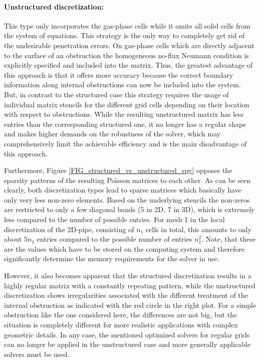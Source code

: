 \paragraph{Unstructured discretization:} This type only incorporates the gas-phase cells while it omits all solid cells from the system of equations. This strategy is the only way to completely get rid of the undesirable penetration errors. On gas-phase cells which are directly adjacent to the surface of an obstruction the homogeneous no-flux Neumann condition is explicitly specified and included into the matrix. Thus, the greatest advantage of this approach is that it offers more accuracy because the correct boundary information along  internal obstructions can now be included into the system. But, in contrast to the structured case this strategy requires the usage of individual matrix stencils for the different grid cells depending on their location with respect to obstructions. While the resulting unstructured matrix has less entries than the corresponding structured one, it no longer has a regular shape and makes higher demands on the robustness of the solver, which may comprehensively limit the achievable efficiency and is the main disadvantage of this approach. 

\vspace{0.5cm}
Furthermore, Figure \ref{FIG_structured_vs_unstructured_spy} opposes the sparsity patterns of the resulting Poisson matrices to each other. As can be seen clearly, both discretization types lead to sparse matrices which basically have only very less non-zero elements. Based on the underlying stencils the non-zeros are restricted to only a few diagonal bands (5 in 2D, 7 in 3D),
which is extremely less compared to the number of possible entries.
For mesh 1 in the local discretization of the 2D-pipe, consisting of $n_1$ cells in total, this amounts to only about $5 n_1$ entries compared to the possible number of entries $n_1^2$. 
Note, that these are the values which have to be stored on the computing system and therefore significantly determine the memory requirements for the solver in use.

However, it also becomes apparent that the structured discretization results in a highly regular matrix with a constantly repeating pattern, while the unstructured discretization shows irregularities associated with the different treatment of the internal obstruction as indicated with the red circle in the right plot. 
For a simple obstruction like the one considered here, the differences are not big, but the situation is completely different for more realistic applications with complex geometric details. In any case, the mentioned optimized solvers for regular grids can no longer be applied in the unstructured case and more generally applicable solvers must be used.


